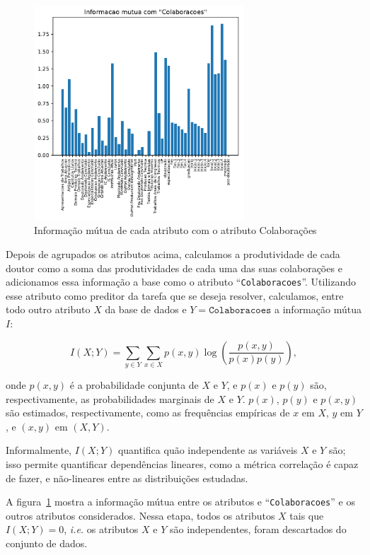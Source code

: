 \documentclass[12pt]{article}
\begin{document}
\begin{figure}
  \centering
  \includegraphics[width=0.7\textwidth]{graphs/mutual_information.pdf}
  \caption{Informação mútua de cada atributo com o atributo Colaborações}
  \label{fig:mutual-info}
\end{figure}

Depois de agrupados os atributos acima, calculamos a produtividade de cada doutor como a soma das produtividades de cada uma das suas colaborações e adicionamos essa informação a base como o atributo ``\texttt{Colaboracoes}''.
Utilizando esse atributo como preditor da tarefa que se deseja resolver, calculamos, entre todo outro atributo $X$ da base de dados e $Y = \texttt{Colaboracoes}$ a informação mútua $I$:

\begin{equation}
  I(X; Y) = \sum_{y \in Y} \sum_{x \in X} p(x, y) \log \left( \frac{p(x, y)}{p(x)p(y)} \right),
\end{equation}

onde $p(x, y)$ é a probabilidade conjunta de $X$ e $Y$, e $p(x)$ e $p(y)$ são, respectivamente, as probabilidades marginais de $X$ e $Y$.
$p(x)$, $p(y)$ e $p(x, y)$ são estimados, respectivamente, como as frequências empíricas de $x$ em $X$, $y$ em $Y$, e $(x, y)$ em $(X, Y)$.

Informalmente, $I(X; Y)$ quantifica quão independente as variáveis $X$ e $Y$ são; isso permite quantificar dependências lineares, como a métrica correlação é capaz de fazer, e não-lineares entre as distribuições estudadas.

A figura~\ref{fig:mutual-info} mostra a informação mútua entre os atributos e ``\texttt{Colaboracoes}'' e os outros atributos considerados.
Nessa etapa, todos os atributos $X$ tais que $I(X; Y) = 0$, \emph{i.e.} os atributos $X$ e $Y$ são independentes, foram descartados do conjunto de dados.
\end{document}
